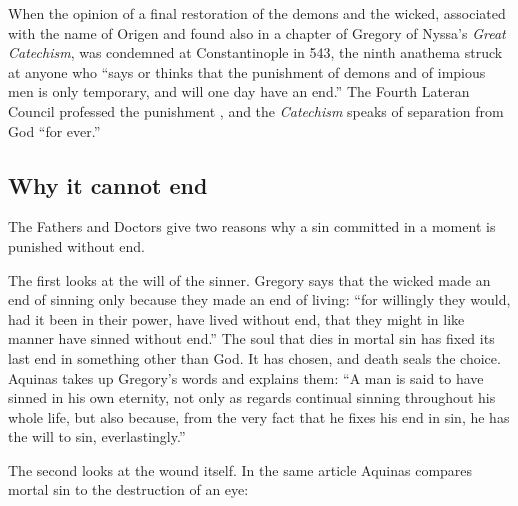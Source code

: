 When the opinion of a final restoration of the demons and the wicked, associated with the name of Origen and found also in a chapter of Gregory of Nyssa's \emph{Great Catechism}, was condemned at Constantinople in 543, the ninth anathema struck at anyone who ``says or thinks that the punishment of demons and of impious men is only temporary, and will one day have an end.'' The Fourth Lateran Council professed the punishment , and the \emph{Catechism} speaks of separation from God ``for ever.''

\subsection{Why it cannot end}

The Fathers and Doctors give two reasons why a sin committed in a moment is punished without end.

The first looks at the will of the sinner. Gregory says that the wicked made an end of sinning only because they made an end of living: ``for willingly they would, had it been in their power, have lived without end, that they might in like manner have sinned without end.'' The soul that dies in mortal sin has fixed its last end in something other than God. It has chosen, and death seals the choice. Aquinas takes up Gregory's words and explains them: ``A man is said to have sinned in his own eternity, not only as regards continual sinning throughout his whole life, but also because, from the very fact that he fixes his end in sin, he has the will to sin, everlastingly.''

The second looks at the wound itself. In the same article Aquinas compares mortal sin to the destruction of an eye:

